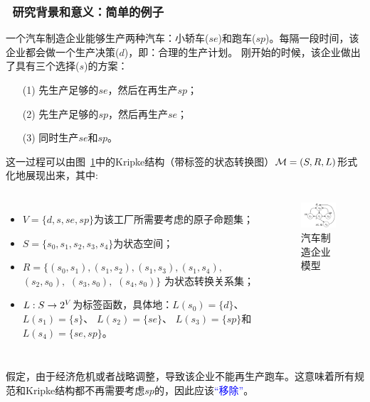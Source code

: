 \documentclass[9pt, CJK]{beamer}
\begin{document}
\begin{frame}
	\frametitle{~研究背景和意义：{\small 简单的例子}}
	{\scriptsize \begin{example}[汽车制造企业模型]\label{car_manufacturing}
		
			一个汽车制造企业能够生产两种汽车：小轿车($se$)和跑车($sp$)。每隔一段时间，该企业都会做一个生产决策($d$)，即：合理的生产计划。
			刚开始的时候，该企业做出了具有三个选择($s$)的方案：
			\begin{itemize}
				\item[(1)] 先生产足够的$se$，然后在再生产$sp$；
				\item[(2)] 先生产足够的$sp$，然后再生产$se$；
				\item[(3)] 同时生产$se$和$sp$。
			\end{itemize}
		这一过程可以由图~\ref{BVM}中的Kripke结构（带标签的状态转换图）${\cal M}=(S,R,L)$形式化地展现出来，其中:
		\begin{columns}
			\begin{itemize}
				\item $V=\{d,s, se, sp\}$为该工厂所需要考虑的原子命题集；
				\item $S=\{s_0,s_1,s_2,s_3,s_4\}$为状态空间；
				\item $R = \{(s_0, s_1), (s_1,s_2), (s_1,s_3), (s_1,s_4),
				$ $(s_2,s_0),$ $(s_3,s_0),$ $(s_4,s_0)\}$ 为状态转换关系集；
				\item $L: S \rightarrow 2^V$为标签函数，具体地：$L(s_0) = \{d\}$、$L(s_1) = \{s\}$、 $L(s_2)=\{se\}$、 $L(s_3) = \{sp\}$和$L(s_4) = \{se,sp\}$。
			\end{itemize}
			 \begin{figure} 
			 	\includegraphics[width=3cm]{figures/NnewCar}
			 	\caption{汽车制造企业模型}\label{BVM}
			 \end{figure} 
		\end{columns} 
		假定，由于经济危机或者战略调整，导致该企业不能再生产跑车。这意味着所有规范和Kripke结构都不再需要考虑$sp$的，因此应该\textcolor{blue}{“移除”}。
	\end{example}}
\end{frame}
	
\end{document}
